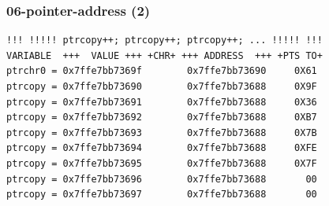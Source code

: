 \documentclass[aspectratio=169, xcolor=table, notheorems, hyperref={pdfpagelabels=false}]{beamer}
\begin{document}
\begin{frame}[fragile]
\frametitle{06-pointer-address (2)}
\begin{lstlisting}[basicstyle=\ttfamily\tiny]
!!! !!!!! ptrcopy++; ptrcopy++; ptrcopy++; ... !!!!! !!!
VARIABLE  +++  VALUE +++ +CHR+ +++ ADDRESS  +++ +PTS TO+
ptrchr0 = 0x7ffe7bb7369f        0x7ffe7bb73690     0X61
ptrcopy = 0x7ffe7bb73690        0x7ffe7bb73688     0X9F
ptrcopy = 0x7ffe7bb73691        0x7ffe7bb73688     0X36
ptrcopy = 0x7ffe7bb73692        0x7ffe7bb73688     0XB7
ptrcopy = 0x7ffe7bb73693        0x7ffe7bb73688     0X7B
ptrcopy = 0x7ffe7bb73694        0x7ffe7bb73688     0XFE
ptrcopy = 0x7ffe7bb73695        0x7ffe7bb73688     0X7F
ptrcopy = 0x7ffe7bb73696        0x7ffe7bb73688       00
ptrcopy = 0x7ffe7bb73697        0x7ffe7bb73688       00
\end{lstlisting}

\begin{minipage}[t]{120mm}
\end{minipage}

\end{frame}
\end{document}
